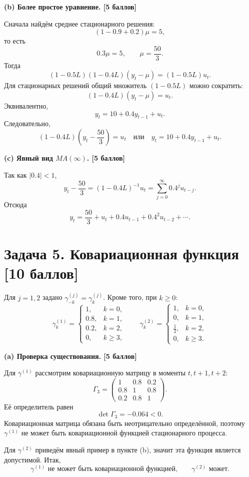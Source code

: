 \documentclass[12pt]{article}
\newcommand{\step}[1]{\medskip\noindent\textbf{#1}\par\nobreak\vspace{2pt}}
\begin{document}
\step{(b) Более простое уравнение. \hfill [5 баллов]}
Сначала найдём среднее стационарного решения:
\[
(1-0.9+0.2)\mu=5,
\]
то есть
\[
0.3\mu=5,\qquad \mu=\frac{50}{3}.
\]
Тогда
\[
(1-0.5L)(1-0.4L)(y_t-\mu)=(1-0.5L)u_t.
\]
Для стационарных решений общий множитель $(1-0.5L)$ можно сократить:
\[
(1-0.4L)(y_t-\mu)=u_t.
\]
Эквивалентно,
\[
y_t=10+0.4y_{t-1}+u_t.
\]
Следовательно,
\[
\boxed{(1-0.4L)\left(y_t-\frac{50}{3}\right)=u_t}
\quad\text{или}\quad
\boxed{y_t=10+0.4y_{t-1}+u_t.}
\]

\step{(c) Явный вид $MA(\infty)$. \hfill [5 баллов]}
Так как $|0.4|<1$,
\[
y_t-\frac{50}{3}=(1-0.4L)^{-1}u_t
=\sum_{j=0}^{\infty}0.4^j u_{t-j}.
\]
Отсюда
\[
\boxed{
y_t=\frac{50}{3}+u_t+0.4u_{t-1}+0.4^2u_{t-2}+\cdots.
}
\]

\section*{Задача 5. Ковариационная функция \hfill [10 баллов]}

Для $j=1,2$ задано $\gamma^{(j)}_{-k}=\gamma^{(j)}_k$. Кроме того, при $k\ge 0$:
\[
\gamma^{(1)}_k=
\begin{cases}
1, & k=0,\\
0.8, & k=1,\\
0.2, & k=2,\\
0, & k\ge 3,
\end{cases}
\qquad
\gamma^{(2)}_k=
\begin{cases}
1, & k=0,\\
0, & k=1,\\
\frac12, & k=2,\\
0, & k\ge 3.
\end{cases}
\]

\step{(a) Проверка существования. \hfill [5 баллов]}
Для $\gamma^{(1)}$ рассмотрим ковариационную матрицу в моменты $t,t+1,t+2$:
\[
\Gamma_3=
\begin{pmatrix}
1 & 0.8 & 0.2\\
0.8 & 1 & 0.8\\
0.2 & 0.8 & 1
\end{pmatrix}.
\]
Её определитель равен
\[
\det\Gamma_3=-0.064<0.
\]
Ковариационная матрица обязана быть неотрицательно определённой, поэтому $\gamma^{(1)}$ не может быть ковариационной функцией стационарного процесса.

Для $\gamma^{(2)}$ приведём явный пример в пункте (b), значит эта функция является допустимой.
Итак,
\[
\boxed{\gamma^{(1)}\text{ не может быть ковариационной функцией,}\qquad
\gamma^{(2)}\text{ может.}}
\]
\end{document}
